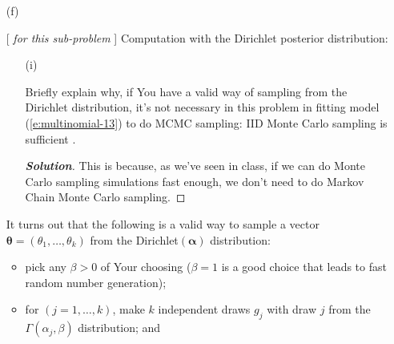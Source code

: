 \documentclass[12pt]{article}
\newenvironment{solution}{\begin{tcolorbox}[breakable]\begin{proof}[\textbf{\textit{Solution}}] }{\end{proof}\end{tcolorbox}}
\begin{document}
\begin{itemize}
\begin{itemize}
\begin{itemize}
\begin{solution}
    This follows simply from the fact that our posterior "votes" are a sum of our prior votes ($\alpha_i$) and data votes ($n_i$) for $i = 1,2, \dots, k $. So if context were to suggest a low information prior, that would be the same as our $\alpha_i$'s being positive, but specifically close to zero. 
\end{solution}

\end{itemize}

\item[(f)]

[ \textit{ \vspace*{0.025in} for this sub-problem} ] 
Computation with the Dirichlet posterior distribution:

\begin{itemize}

\item[(i)]

Briefly explain why, if You have a valid way of sampling from the Dirichlet distribution, it's not necessary in this problem in fitting model (\ref{e:multinomial-13}) to do MCMC sampling: IID Monte Carlo sampling is sufficient \textit{\fbox{\textbf{[5 points]}}}. \vspace*{0.025in} 
\begin{solution}
    This is because, as we've seen in class, if we can do Monte Carlo sampling simulations fast enough, we don't need to do Markov Chain Monte Carlo sampling.  
\end{solution}

\end{itemize}

It turns out that the following is a valid way to sample a vector $\bm{ \theta } = ( \theta_1, \dots, \theta_k )$ from the Dirichlet$( \bm{ \alpha } )$ distribution: 

\begin{itemize}

\item

pick any $\beta > 0$ of Your choosing ($\beta = 1$ is a good choice that leads to fast random number generation);

\item

for $( j = 1, \dots, k )$, make $k$ independent draws $g_j$ with draw $j$ from the $\Gamma ( \alpha_j , \beta )$ distribution; and 


\end{itemize}
\end{itemize}
\end{itemize}
\end{document}
